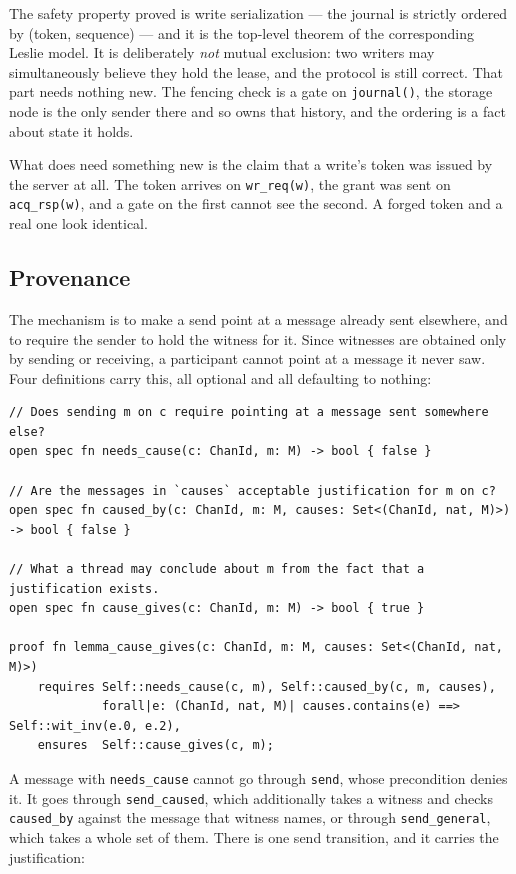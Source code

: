 \documentclass[11pt]{article}
\newcommand{\code}[1]{\texttt{#1}}
\newcommand{\srcname}[1]{%
  \vspace{0.9em}\noindent{\sffamily\scriptsize\color{comment}\MakeUppercase{#1}}\par
  \vspace{-0.7em}}
\begin{document}
The safety property proved is write serialization --- the journal is strictly
ordered by (token, sequence) --- and it is the top-level theorem of the
corresponding Leslie model. It is deliberately \emph{not} mutual exclusion: two
writers may simultaneously believe they hold the lease, and the protocol is
still correct. That part needs nothing new. The fencing check is a gate on
\code{journal()}, the storage node is the only sender there and so owns that
history, and the ordering is a fact about state it holds.

What does need something new is the claim that a write's token was issued by the
server at all. The token arrives on \code{wr\_req(w)}, the grant was sent on
\code{acq\_rsp(w)}, and a gate on the first cannot see the second. A forged
token and a real one look identical.

\subsection*{Provenance}

The mechanism is to make a send point at a message already sent elsewhere, and
to require the sender to hold the witness for it. Since witnesses are obtained
only by sending or receiving, a participant cannot point at a message it never
saw. Four definitions carry this, all optional and all defaulting to nothing:

\srcname{src/tok.rs --- the provenance interface}
\begin{lstlisting}
// Does sending m on c require pointing at a message sent somewhere else?
open spec fn needs_cause(c: ChanId, m: M) -> bool { false }

// Are the messages in `causes` acceptable justification for m on c?
open spec fn caused_by(c: ChanId, m: M, causes: Set<(ChanId, nat, M)>) -> bool { false }

// What a thread may conclude about m from the fact that a justification exists.
open spec fn cause_gives(c: ChanId, m: M) -> bool { true }

proof fn lemma_cause_gives(c: ChanId, m: M, causes: Set<(ChanId, nat, M)>)
    requires Self::needs_cause(c, m), Self::caused_by(c, m, causes),
             forall|e: (ChanId, nat, M)| causes.contains(e) ==> Self::wit_inv(e.0, e.2),
    ensures  Self::cause_gives(c, m);
\end{lstlisting}

A message with \code{needs\_cause} cannot go through \code{send}, whose
precondition denies it. It goes through \code{send\_caused}, which additionally
takes a witness and checks \code{caused\_by} against the message that witness
names, or through \code{send\_general}, which takes a whole set of them. There
is one send transition, and it carries the justification:
\end{document}
